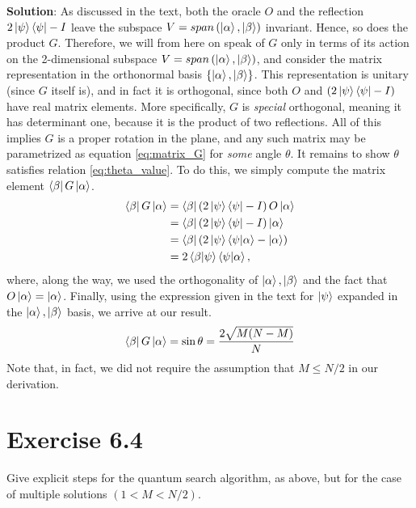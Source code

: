 \documentclass{book}
\begin{document}
    \textbf{Solution}: As discussed in the text, both the oracle $O$ and the reflection $2\ket{\psi}\bra{\psi}-I$ leave the subspace $V = span\left(\ket{\alpha},\ket{\beta}\right)$ invariant. Hence, so does the product $G$. Therefore, we will from here on speak of $G$ only in terms of its action on the 2-dimensional subspace $V = span\left(\ket{\alpha},\ket{\beta}\right)$, and consider the matrix representation in the orthonormal basis $\{\ket{\alpha},\ket{\beta}\}$. This representation is unitary (since $G$ itself is), and in fact it is orthogonal, since both $O$ and $(2\ket{\psi}\bra{\psi}-I)$ have real matrix elements. More specifically, $G$ is \emph{special} orthogonal, meaning it has determinant one, because it is the product of two reflections. All of this implies $G$ is a proper rotation in the plane, and any such matrix may be parametrized as equation \eqref{eq:matrix_G} for \emph{some} angle $\theta$. It remains to show $\theta$ satisfies relation \eqref{eq:theta_value}. To do this, we simply compute the matrix element $\bra{\beta}G\ket{\alpha}$.
    \begin{align}
    \begin{aligned}
        \bra{\beta}G\ket{\alpha} &= \bra{\beta}\left(2\ket{\psi}\bra{\psi}-I\right)O\ket{\alpha} \\
        &=\bra{\beta}\left(2\ket{\psi}\bra{\psi}-I\right)\ket{\alpha}\\
        &=\bra{\beta}\left(2\ket{\psi}\braket{\psi}{\alpha}-\ket{\alpha}\right) \\
        &=2\braket{\beta}{\psi}\braket{\psi}{\alpha},
    \end{aligned}
    \end{align}
    where, along the way, we used the orthogonality of $\ket{\alpha},\ket{\beta}$ and the fact that $O\ket{\alpha} = \ket{\alpha}$. Finally, using the expression given in the text for $\ket{\psi}$ expanded in the $\ket{\alpha},\ket{\beta}$ basis, we arrive at our result. 
    \begin{align}
        \bra{\beta}G\ket{\alpha} = \sin\theta = \frac{2\sqrt{M(N-M)}}{N}
    \end{align}
    Note that, in fact, we did not require the assumption that $M\leq N/2$ in our derivation.

\section*{Exercise 6.4}
    Give explicit steps for the quantum search algorithm, as above, but for the case of multiple solutions $(1<M<N/2)$.
    
\end{document}
